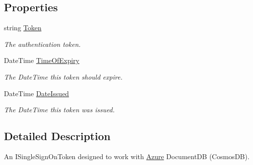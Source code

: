\subsection*{Properties}
\begin{DoxyCompactItemize}
\item 
string \hyperlink{classCqrs_1_1Azure_1_1DocumentDb_1_1Repositories_1_1Authentication_1_1AzureSingleSignOnToken_ad8db4fad59b85056e4e37c9e29226425_ad8db4fad59b85056e4e37c9e29226425}{Token}
\begin{DoxyCompactList}\small\item\em The authentication token. \end{DoxyCompactList}\item 
Date\+Time \hyperlink{classCqrs_1_1Azure_1_1DocumentDb_1_1Repositories_1_1Authentication_1_1AzureSingleSignOnToken_a72467ad344da70ee03355d03f9a3f25e_a72467ad344da70ee03355d03f9a3f25e}{Time\+Of\+Expiry}
\begin{DoxyCompactList}\small\item\em The Date\+Time this token should expire. \end{DoxyCompactList}\item 
Date\+Time \hyperlink{classCqrs_1_1Azure_1_1DocumentDb_1_1Repositories_1_1Authentication_1_1AzureSingleSignOnToken_a1443fa350c304438a9a57c458717eeef_a1443fa350c304438a9a57c458717eeef}{Date\+Issued}
\begin{DoxyCompactList}\small\item\em The Date\+Time this token was issued. \end{DoxyCompactList}\end{DoxyCompactItemize}


\subsection{Detailed Description}
An I\+Single\+Sign\+On\+Token designed to work with \hyperlink{namespaceCqrs_1_1Azure}{Azure} Document\+DB (Cosmos\+DB). 



